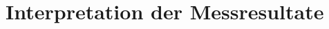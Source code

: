 \clearpage

\section{Interpretation der Messresultate}\label{sec:InterpretationderMessresultate}







